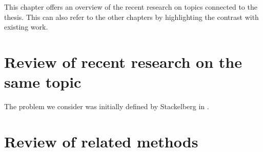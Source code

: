 
\label{chap:LiteratureReview}

This chapter offers an overview of the recent research on topics connected to the thesis.
This can also refer to the other chapters by highlighting the contrast with existing work.

\section{Review of recent research on the same topic}

The problem we consider was initially defined by Stackelberg in \cite{stackelberg}.

\section{Review of related methods}
